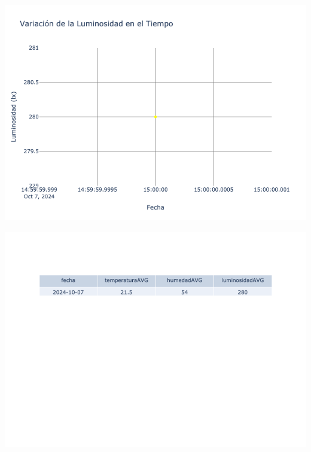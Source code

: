 \documentclass{article}
\begin{document}
    \noindent
    \begin{minipage}{0.48\textwidth}
        \centering
        \includegraphics[width=\textwidth]{../img/poli/LS302-90Dias-03-12-2024.png}
    \end{minipage}
    \hfill
    \begin{minipage}{0.48\textwidth}
        \centering
        \includegraphics[width=\textwidth]{../img/tables/CAVG302-90Dias-03-12-2024.png}
    \end{minipage}
    
\end{document}
